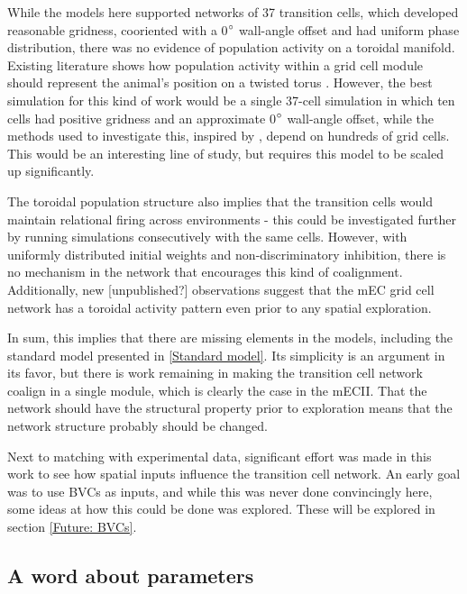 \documentclass{article}
\begin{document}
    While the models here supported networks of 37 transition cells, which developed reasonable gridness, cooriented with a 0\(\degree\) wall-angle offset and had uniform phase distribution, there was no evidence of population activity on a toroidal manifold. Existing literature shows how population activity within a grid cell module should represent the animal's position on a twisted torus \parencite{Gardner2022}. However, the best simulation for this kind of work would be a single 37-cell simulation in which ten cells had positive gridness and an approximate 0\(\degree\) wall-angle offset, while the methods used to investigate this, inspired by \parencite{Gardner2022}, depend on hundreds of grid cells. This would be an interesting line of study, but requires this model to be scaled up significantly. 

    The toroidal population structure also implies that the transition cells would maintain relational firing across environments - this could be investigated further by running simulations consecutively with the same cells. However, with uniformly distributed initial weights and non-discriminatory inhibition, there is no mechanism in the network that encourages this kind of coalignment. Additionally, new [unpublished?] observations suggest that the mEC grid cell network has a toroidal activity pattern even prior to any spatial exploration.

    In sum, this implies that there are missing elements in the models, including the standard model presented in \ref{Standard model}. Its simplicity is an argument in its favor, but there is work remaining in making the transition cell network coalign in a single module, which is clearly the case in the mECII. That the network should have the structural property prior to exploration means that the network structure probably should be changed.

    Next to matching with experimental data, significant effort was made in this work to see how spatial inputs influence the transition cell network. An early goal was to use BVCs as inputs, and while this was never done convincingly here, some ideas at how this could be done was explored. These will be explored in section \ref{Future: BVCs}.

    \subsection{A word about parameters}\label{ParameterDiscussion}
\end{document}
